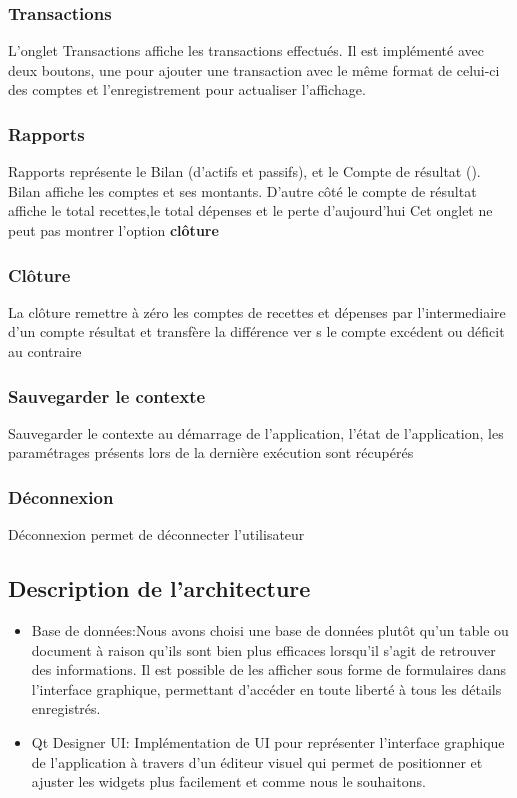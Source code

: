 \documentclass[10pt,a4paper,openany]{report}
\begin{document}
	\subsubsection{Transactions}
	L'onglet Transactions affiche les transactions effectués. Il est implémenté avec deux boutons, une pour ajouter une transaction avec le même format de celui-ci des comptes et l'enregistrement pour actualiser l'affichage.
	
	\subsubsection{Rapports}
	Rapports représente le Bilan (d'actifs et passifs), et le Compte de résultat (). Bilan affiche les comptes et ses montants. D'autre côté le compte de résultat affiche le total recettes,le total dépenses et le perte d'aujourd'hui
	Cet onglet ne peut pas montrer l'option \textbf{clôture}
	
	\subsubsection{Clôture}
	La clôture remettre à zéro les comptes de recettes et dépenses par l'intermediaire d'un compte résultat et transfère la différence ver s le compte excédent ou déficit au contraire
	
	\subsubsection{Sauvegarder le contexte}
	Sauvegarder le contexte au démarrage de l'application, l'état de l'application, les paramétrages présents lors de la dernière exécution sont récupérés
	
	\subsubsection{Déconnexion}
	Déconnexion permet de déconnecter l'utilisateur
	
	
	\subsection{Description de l'architecture}
	
	\begin{itemize}
		\item Base de données:Nous avons choisi une base de données plutôt qu'un table ou document à raison qu'ils sont bien plus efficaces lorsqu'il s'agit de retrouver des informations. Il est possible de les afficher sous forme de formulaires dans l'interface graphique, permettant d'accéder en toute liberté à tous les détails enregistrés.
		\item Qt Designer UI: Implémentation de UI pour représenter l'interface graphique de l'application à travers d'un éditeur visuel qui permet de positionner et ajuster les widgets plus facilement et comme nous le souhaitons.

	\end{itemize}
	
\end{document}
